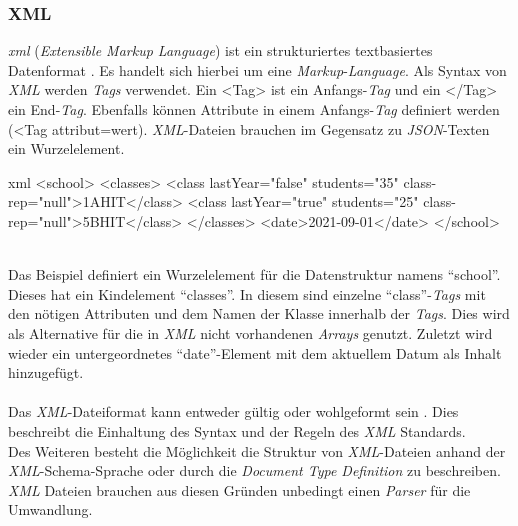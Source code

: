		\subsubsection{XML}
		\textit{\Gls{xml}} (\textit{Extensible Markup Language}) ist ein strukturiertes textbasiertes Datenformat \cite{xmlStandard}. Es handelt sich hierbei um eine \textit{Markup}-\textit{Language}. Als Syntax von \textit{XML} werden \textit{Tags} verwendet. Ein <Tag> ist ein Anfangs-\textit{Tag} und ein </Tag> ein End-\textit{Tag}. Ebenfalls können Attribute in einem Anfangs-\textit{Tag} definiert werden (<Tag attribut=\dq wert\dq ). \textit{XML}-Dateien brauchen im Gegensatz zu \textit{JSON}-Texten ein Wurzelelement.
		\begin{code}{xml}
		<school>
			<classes>
				<class lastYear="false" students="35" class-rep="null">1AHIT</class>
				<class lastYear="true" students="25" class-rep="null">5BHIT</class>
			</classes>
			<date>2021-09-01</date>
		</school>
		\end{code}
		\label{code:xml}~\\
		Das Beispiel definiert ein Wurzelelement für die Datenstruktur namens \enquote{school}. Dieses hat ein Kindelement \enquote{classes}. In diesem sind einzelne \enquote{class}-\textit{Tags} mit den nötigen Attributen und dem Namen der Klasse innerhalb der \textit{Tags}. Dies wird als Alternative für die in \textit{XML} nicht vorhandenen \textit{Arrays} genutzt. Zuletzt wird wieder ein untergeordnetes \enquote{date}-Element mit dem aktuellem Datum als Inhalt hinzugefügt.\\~\\
		Das \textit{XML}-Dateiformat kann entweder gültig oder wohlgeformt sein \cite{xmlStandard}. Dies beschreibt die Einhaltung des Syntax und der Regeln des \textit{XML} Standards.\\
		Des Weiteren besteht die Möglichkeit die Struktur von \textit{XML}-Dateien anhand der \textit{XML}-Schema-Sprache oder durch die \textit{Document Type Definition} zu beschreiben. \textit{XML} Dateien brauchen aus diesen Gründen unbedingt einen \textit{Parser} für die Umwandlung.
		
		\newpage
		
